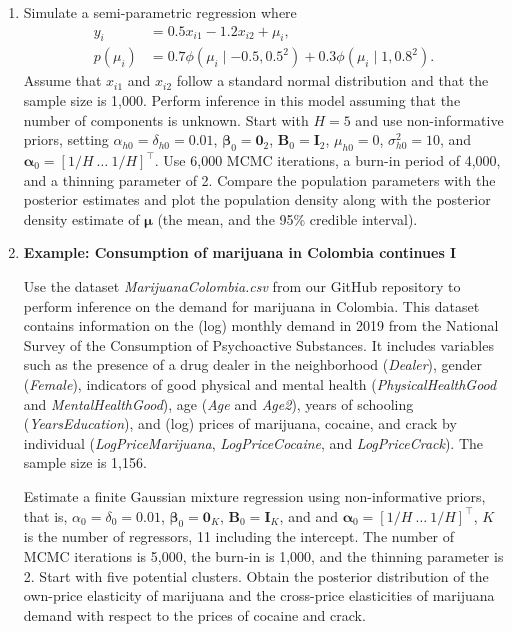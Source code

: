 \begin{enumerate}
	\item Simulate a semi-parametric regression where  
	\begin{align*}
		y_i &= 0.5x_{i1} - 1.2x_{i2} + \mu_i, \\
		p(\mu_i) &= 
		0.7 \phi(\mu_i \mid -0.5,0.5^2) + 0.3 \phi(\mu_i \mid 1,0.8^2).		
	\end{align*}
	Assume that $x_{i1}$ and $x_{i2}$ follow a standard normal distribution and that the sample size is 1,000. Perform inference in this model assuming that the number of components is unknown. Start with $H=5$ and use non-informative priors, setting $\alpha_{h0}=\delta_{h0}=0.01$, $\boldsymbol{\beta}_0=\boldsymbol{0}_2$, $\boldsymbol{B}_0=\boldsymbol{I}_2$, $\mu_{h0}=0$, $\sigma^2_{h0}=10$, and $\boldsymbol{\alpha}_0=[1/H \ \dots \ 1/H]^{\top}$. Use 6,000 MCMC iterations, a burn-in period of 4,000, and a thinning parameter of 2. Compare the population parameters with the posterior estimates and plot the population density along with the posterior density estimate of $\boldsymbol{\mu}$ (the mean, and the 95\% credible interval).
	
	\item \textbf{Example: Consumption of marijuana in Colombia continues I}
	
	Use the dataset \textit{MarijuanaColombia.csv} from our GitHub repository to perform inference on the demand for marijuana in Colombia. This dataset contains information on the (log) monthly demand in 2019 from the National Survey of the Consumption of Psychoactive Substances. It includes variables such as the presence of a drug dealer in the neighborhood (\textit{Dealer}), gender (\textit{Female}), indicators of good physical and mental health (\textit{PhysicalHealthGood} and \textit{MentalHealthGood}), age (\textit{Age} and \textit{Age2}), years of schooling (\textit{YearsEducation}), and (log) prices of marijuana, cocaine, and crack by individual (\textit{LogPriceMarijuana}, \textit{LogPriceCocaine}, and \textit{LogPriceCrack}). The sample size is 1,156.
	
	Estimate a finite Gaussian mixture regression using non-informative priors, that is, $\alpha_{0}=\delta_{0}=0.01$, $\boldsymbol{\beta}_{0}=\boldsymbol{0}_K$, $\boldsymbol{B}_{0}=\boldsymbol{I}_K$, and and $\boldsymbol{\alpha}_0=[1/H \ \dots \ 1/H]^{\top}$, $K$ is the number of regressors, 11 including the intercept. The number of MCMC iterations is 5,000, the burn-in is 1,000, and the thinning parameter is 2. Start with five potential clusters. Obtain the posterior distribution of the own-price elasticity of marijuana and the cross-price elasticities of marijuana demand with respect to the prices of cocaine and crack.
	

\end{enumerate}
